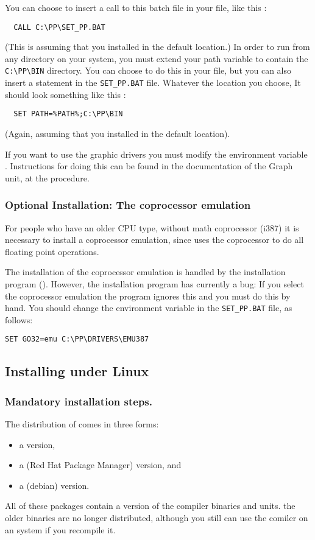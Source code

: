 \documentclass{report}
\begin{document}
You can choose to insert a call to this batch file in your 
file, like this :
\begin{verbatim}
  CALL C:\PP\SET_PP.BAT
\end{verbatim}
(This is assuming that you installed \fpc in the default location.)
In order to run \fpc from any directory on your system, you must extend 
your path variable to contain the \verb|C:\PP\BIN| directory.
You can choose to do this in your  file, but you can also
insert a statement in the \verb|SET_PP.BAT| file. Whatever the location you
choose, It should look something like this : 
\begin{verbatim}
  SET PATH=%PATH%;C:\PP\BIN
\end{verbatim}
(Again, assuming that you installed in the default location).
 
If you want to use the graphic drivers you must modify the
environment variable . Instructions for doing this can be found
in the documentation of the Graph unit, at the  procedure.

\subsubsection{Optional Installation: The coprocessor emulation}
For people who have an older CPU type, without math coprocessor (i387)
it is necessary to install a coprocessor emulation, since \fpc uses the
coprocessor to do all floating point operations.

The installation of the coprocessor emulation is handled by the 
installation program (). However,
the installation program has currently a bug: If you select the
coprocessor emulation the program ignores this and you must do
this by hand. You should change the  environment variable in
the \verb|SET_PP.BAT| file, as follows:
\begin{verbatim}
SET GO32=emu C:\PP\DRIVERS\EMU387 
\end{verbatim}

%
%
\subsection{Installing under Linux}
\subsubsection{Mandatory installation steps.}
The \linux distribution of \fpc comes in three forms:
\begin{itemize}
\item a  version,
\item a  (Red Hat Package Manager) version, and
\item a  (debian) version.
\end{itemize}
All of these packages contain a  version of the compiler binaries and
units. the older  binaries are no longer distributed, although you
still can use the comiler on an  system if you recompile it.
\end{document}
